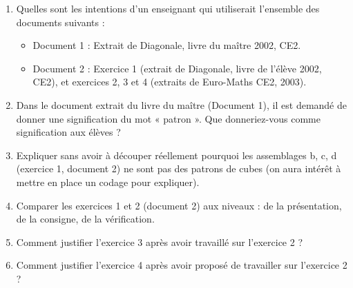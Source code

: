 \begin{exercice} %
\begin{enumerate}
   \item Quelles sont les intentions d'un enseignant qui utiliserait l'ensemble des documents suivants :
   \begin{itemize}
      \item Document 1 : Extrait de Diagonale, livre du maître 2002, CE2.
      \item Document 2 : Exercice 1 (extrait de Diagonale, livre de l'élève 2002, CE2), et exercices 2, 3 et 4 (extraits de Euro-Maths CE2, 2003).
   \end{itemize}
   \item Dans le document extrait du livre du maître (Document 1), il est demandé de donner une signification du mot « patron ». Que donneriez-vous comme signification aux élèves ?
   \item Expliquer sans avoir à découper réellement pourquoi les assemblages b, c, d (exercice 1, document 2) ne sont pas des patrons de cubes (on aura intérêt à mettre en place un codage pour expliquer).
   \item Comparer les exercices 1 et 2 (document 2) aux niveaux : de la présentation, de la consigne, de la vérification.
   \item Comment justifier l'exercice 3 après avoir travaillé sur l'exercice 2 ?
   \item Comment justifier l'exercice 4 après avoir proposé de travailler sur l'exercice 2 ?
\end{enumerate}


\end{exercice}
